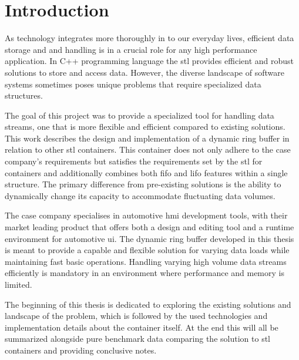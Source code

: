 
\chapter{Introduction}

As technology integrates more thoroughly in to our everyday lives, efficient data storage and and handling is in a crucial role for any high performance application. In C++ programming language the \gls{stl} provides efficient and robust solutions to store and access data. However, the diverse landscape of software systems sometimes poses unique problems that require specialized data structures.

The goal of this project was to provide a specialized tool for handling data streams, one that is more flexible and efficient compared to existing solutions. This work describes the design and implementation of a dynamic ring buffer in relation to other \gls{stl} containers. This container does not only adhere to the case company's requirements but satisfies the requirements set by the \gls{stl} for containers and additionally combines both \gls{fifo} and \gls{lifo} features within a single structure.  The primary difference from pre-existing solutions is the ability to dynamically change its capacity to accommodate fluctuating data volumes.

The case company specialises in automotive \gls{hmi} development tools, with their market leading product that offers both a design and editing tool and a runtime environment for automotive \gls{ui}. The dynamic ring buffer developed in this thesis is meant to provide a capable and flexible solution for varying data loads while maintaining fast basic operations. Handling varying high volume data streams efficiently is mandatory in an environment where performance and memory is limited.

The beginning of this thesis is dedicated to exploring the existing solutions and landscape of the problem, which is followed by the used technologies and implementation details about the container itself. At the end this will all be summarized alongside pure benchmark data comparing the solution to \gls{stl} containers and providing conclusive notes.